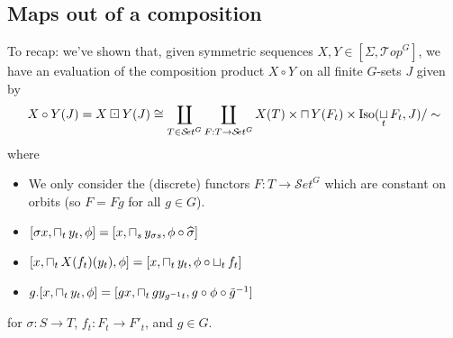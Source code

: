 \documentclass{report}
\newcommand{\Top}{\text{$\mathcal{T}\!op$}}
\newcommand{\Set}{\text{$\mathcal{S}\!et$}}
\DeclareMathOperator{\Iso}{Iso}
\newcommand{\icap}{\operatornamewithlimits{\sqcap}}
\newcommand{\ico}{\operatornamewithlimits{\sqcup}}
\renewcommand{\hat}[1]{\text{$\widehat{#1}$}}
\begin{document}
\subsection{Maps out of a composition}
To recap: we've shown that, given symmetric sequences $X,Y\in[\Sigma, \Top^G]$, we have an evaluation of the composition product $X\circ Y$ on all finite $G$-sets $J$ given by
\[X\circ Y(J) = X\boxdot Y(J) \cong \coprod_{T\in\Set^G}\coprod_{F:T\to\Set^G}X(T)\times \icap Y(F_t)\times \Iso(\ico_tF_t,J)/\sim\]
where
\begin{itemize}\itemsep-4pt
\item We only consider the (discrete) functors $F: T\to\Set^G$ which are constant on orbits (so $F = Fg$ for all $g\in G$).
\item $[\sigma x,\icap_ty_t,\phi] = [x,\icap_sy_{\sigma s},\phi\circ \hat \sigma]$
\item $[x,\icap_tX(f_t)(y_t),\phi] = [x,\icap_ty_t,\phi\circ \ico_tf_t]$
\item $g.[x,\icap_ty_t,\phi] = [gx,\icap_tgy_{g^{-1}t},g\circ\phi\circ\tilde g^{-1}]$
\end{itemize}
for $\sigma: S\to T$, $f_t: F_t\to F'_t$, and $g\in G$. 
\end{document}
